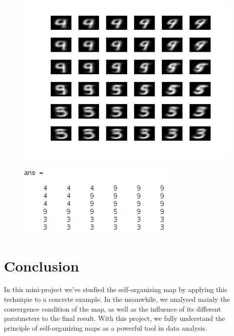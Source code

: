 \documentclass[a4paper, 12pt]{article}
\begin{document}
\begin{minipage}[c]{0.5\textwidth}
  \begin{figure}[h]
    \centering
    \includegraphics[scale=0.4]{../figure/assign.jpg}
  \end{figure}
  \end{minipage}%
  \begin{minipage}[c]{0.5\textwidth}
    \begin{figure}[h]
    \centering
    \includegraphics[scale=0.8]{../figure/assignMatrix.jpg}
    \end{figure}
  \end{minipage}

\section{Conclusion}

In this mini-project we've studied the self-organizing map by applying
this technique to a concrete example. In the meanwhile, we analysed
mainly the convergence condition of the map, as well as the influence of its
different paratmeters to the final result. With this project, we fully
understand the principle of self-organizing maps as a powerful tool in
data analysis.
\end{document}
